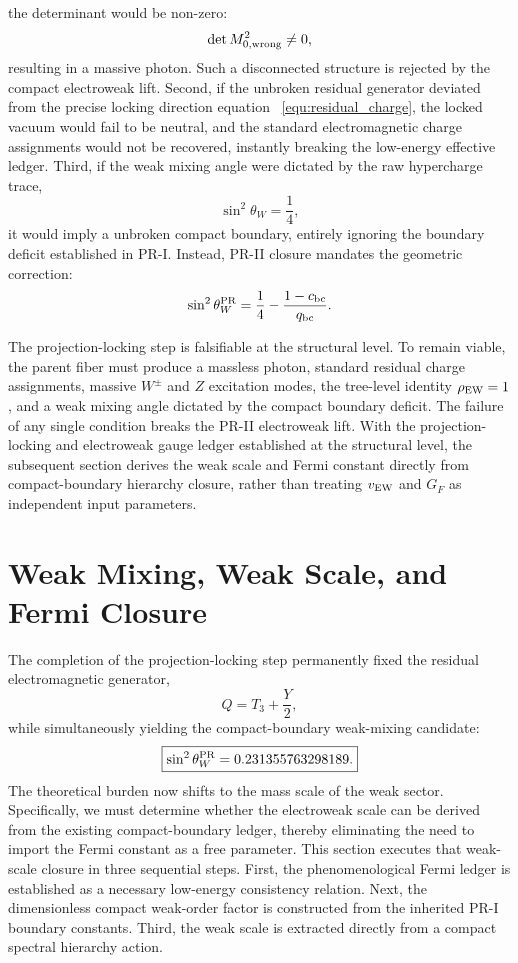 \documentclass[11pt]{article}
\begin{document}
the determinant would be non-zero:
\begin{equation}
\det M_{0,\rm wrong}^2\neq0,
\end{equation}
resulting in a massive photon. Such a disconnected structure is rejected by the compact electroweak lift. Second, if the unbroken residual generator deviated from the precise locking direction equation ~\ref{equ:residual_charge}, the locked vacuum would fail to be neutral, and the standard electromagnetic charge assignments would not be recovered, instantly breaking the low-energy effective ledger. Third, if the weak mixing angle were dictated by the raw hypercharge trace,
\begin{equation}
\sin^2\theta_W=\frac14,
\end{equation}
it would imply a unbroken compact boundary, entirely ignoring the boundary deficit established in PR-I. Instead, PR-II closure mandates the geometric correction:
\begin{equation}
\sin^2\theta_W^{\rm PR}
=
\frac14
-
\frac{1-c_{\rm bc}}{q_{\rm bc}}.
\end{equation}

The projection-locking step is falsifiable at the structural level. To remain viable, the parent fiber must produce a massless photon, standard residual charge assignments, massive \(W^\pm\) and \(Z\) excitation modes, the tree-level identity \(\rho_{\rm EW}=1\), and a weak mixing angle dictated by the compact boundary deficit. The failure of any single condition breaks the PR-II electroweak lift. With the projection-locking and electroweak gauge ledger established at the structural level, the subsequent section derives the weak scale and Fermi constant directly from compact-boundary hierarchy closure, rather than treating \(v_{\rm EW}\) and \(G_F\) as independent input parameters.

\section{Weak Mixing, Weak Scale, and Fermi Closure}
The completion of the projection-locking step permanently fixed the residual electromagnetic generator,
\begin{equation}
\boxed{
Q=T_3+\frac{Y}{2},
}
\end{equation}
while simultaneously yielding the compact-boundary weak-mixing candidate:
\begin{equation}
\boxed{
\sin^2\theta_W^{\rm PR}=
0.231355763298189.
}
\end{equation}
The theoretical burden now shifts to the mass scale of the weak sector. Specifically, we must determine whether the electroweak scale can be derived from the existing compact-boundary ledger, thereby eliminating the need to import the Fermi constant as a free parameter. This section executes that weak-scale closure in three sequential steps. First, the phenomenological Fermi ledger is established as a necessary low-energy consistency relation. Next, the dimensionless compact weak-order factor is constructed from the inherited PR-I boundary constants. Third, the weak scale is extracted directly from a compact spectral hierarchy action.
\end{document}
